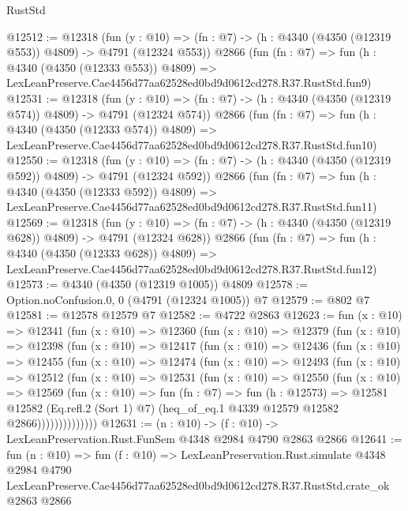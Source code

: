 \begin{lexlean}{RustStd}
\begin{coremodule}
@12512 := @12318
    (fun (y : @10) => (fn : @7) -> (h : @4340 (@4350 (@12319 @553)) @4809) -> @4791 (@12324 @553))
    @2866
    (fun (fn : @7) =>
    fun (h : @4340 (@4350 (@12333 @553)) @4809) =>
    LexLeanPreserve.Cae4456d77aa62528ed0bd9d0612cd278.R37.RustStd.fun9)
@12531 := @12318
    (fun (y : @10) => (fn : @7) -> (h : @4340 (@4350 (@12319 @574)) @4809) -> @4791 (@12324 @574))
    @2866
    (fun (fn : @7) =>
    fun (h : @4340 (@4350 (@12333 @574)) @4809) =>
    LexLeanPreserve.Cae4456d77aa62528ed0bd9d0612cd278.R37.RustStd.fun10)
@12550 := @12318
    (fun (y : @10) => (fn : @7) -> (h : @4340 (@4350 (@12319 @592)) @4809) -> @4791 (@12324 @592))
    @2866
    (fun (fn : @7) =>
    fun (h : @4340 (@4350 (@12333 @592)) @4809) =>
    LexLeanPreserve.Cae4456d77aa62528ed0bd9d0612cd278.R37.RustStd.fun11)
@12569 := @12318
    (fun (y : @10) => (fn : @7) -> (h : @4340 (@4350 (@12319 @628)) @4809) -> @4791 (@12324 @628))
    @2866
    (fun (fn : @7) =>
    fun (h : @4340 (@4350 (@12333 @628)) @4809) =>
    LexLeanPreserve.Cae4456d77aa62528ed0bd9d0612cd278.R37.RustStd.fun12)
@12573 := @4340 (@4350 (@12319 @1005)) @4809
@12578 := Option.noConfusion.{0, 0} (@4791 (@12324 @1005)) @7
@12579 := @802 @7
@12581 := @12578 @12579 @7
@12582 := @4722 @2863
@12623 := fun (x : @10) =>
  @12341
    (fun (x : @10) =>
    @12360
      (fun (x : @10) =>
      @12379
        (fun (x : @10) =>
        @12398
          (fun (x : @10) =>
          @12417
            (fun (x : @10) =>
            @12436
              (fun (x : @10) =>
              @12455
                (fun (x : @10) =>
                @12474
                  (fun (x : @10) =>
                  @12493
                    (fun (x : @10) =>
                    @12512
                      (fun (x : @10) =>
                      @12531
                        (fun (x : @10) =>
                        @12550
                          (fun (x : @10) =>
                          @12569
                            (fun (x : @10) =>
                            fun (fn : @7) =>
                            fun (h : @12573) =>
                            @12581
                              @12582
                              (Eq.refl.{2} (Sort 1) @7)
                              (heq_of_eq.{1} @4339 @12579 @12582 @2866))))))))))))))
@12631 := (n : @10) -> (f : @10) -> LexLeanPreservation.Rust.FunSem @4348 @2984 @4790 @2863 @2866
@12641 := fun (n : @10) =>
  fun (f : @10) =>
  LexLeanPreservation.Rust.simulate
    @4348
    @2984
    @4790
    LexLeanPreserve.Cae4456d77aa62528ed0bd9d0612cd278.R37.RustStd.crate_ok
    @2863
    @2866
\end{coremodule}
\end{lexlean}
